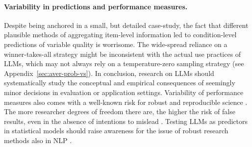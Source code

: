 \documentclass[fleqn]{article}
\begin{document}


\paragraph{Variability in predictions and performance measures.}
Despite being anchored in a small, but detailed case-study, the fact that different plausible methods of aggregating item-level information led to condition-level predictions of variable quality is worrisome.
The wide-spread reliance on a winner-takes-all strategy might be inconsistent with the actual use practices of LLMs, which may not always rely on a temperature-zero sampling strategy (see Appendix~\ref{sec:aver-prob-vs}).
In conclusion, research on LLMs should systematically study the conceptual and empirical consequences of seemingly minor decisions in evaluation or application settings.
Variability of performance measures also comes with a well-known risk for robust and reproducible science \citep[c.f.][]{HuLevy2023:Prompt-based-me,TsvilodubWang2024:Predictions-fro}.
The more researcher degrees of freedom there are, the higher the risk of false results, even in the absence of intentions to mislead \citep[e.g.][]{Ioannidis2005:Why-Most-Publis,Chambers2017:The-Seven-Deadl}.
Testing LLMs as predictors in statistical models should raise awareness for the issue of robust research methods also in NLP \citep{WielingRawee2018:Reproducibility}.
\end{document}
